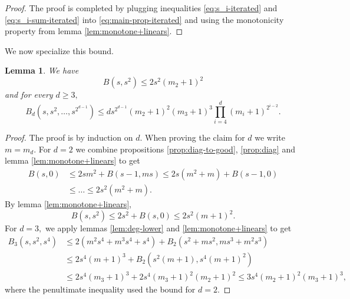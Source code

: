 \documentclass[12pt]{amsart}
\newtheorem{lemma}[theorem]{Lemma}
\theoremstyle{definition}
\begin{document}
\begin{proof}
The proof is completed by plugging inequalities \eqref{eq:s_i-iterated} and \eqref{eq:s_i-sum-iterated} into \eqref{eq:main-prop-iterated} and using the monotonicity property from lemma \ref{lem:monotone+linears}.
\end{proof}

We now specialize this bound.

\begin{lemma}\label{lem:powers-bound}
    We have 
    \[
    B(s,s^2) \le 2s^2(m_2+1)^2
    \]
    and for every $d\ge 3,$
    \[
    B_d(s,s^2,\ldots,s^{2^{d-1}}) \le d s^{2^{d-1}} (m_2+1)^2(m_3+1)^3\prod_{i=4}^d (m_i+1)^{2^{i-2}}. 
    \]
\end{lemma}

\begin{proof}
    The proof is by induction on $d.$ When proving the claim for $d$ we write $m = m_d.$ For $d=2$ we combine propositions \ref{prop:diag-to-good}, \ref{prop:diag} and lemma \ref{lem:monotone+linears} to get
    \begin{align*}
        B(s,0) &\le  2sm^2 +B(s-1,ms) \le 2s(m^2+m) +B(s-1,0) \\
        &\le \ldots \le 2s^2 (m^2+m).
    \end{align*}
    By lemma \ref{lem:monotone+linears},  
    \[
    B(s,s^2) \le 2s^2+B(s,0) \le 2s^2(m+1)^2.
    \]
    For $d = 3,$ we apply lemmas \ref{lem:deg-lower} and \ref{lem:monotone+linears} to get
     \begin{align*}
        B_3(s,s^2,s^4) &\le  2(m^2s^4 + m^3s^4+s^4) + B_2(s^2+ms^2,ms^3+m^2s^3)  \\
    &\le 2s^4(m+1)^3 + B_2(s^2(m+1),s^4(m+1)^2) \\
    &\le 2s^4(m_3+1)^3 + 2s^4(m_3+1)^2(m_2+1)^2 \le 3s^4 (m_2+1)^2(m_3+1)^3,
    \end{align*}
    where the penultimate inequality used the bound for $d=2.$ 


\end{proof}
\end{document}
